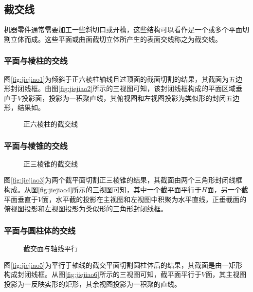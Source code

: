 
\subsection{截交线}
 机器零件通常需要加工一些斜切口或开槽，这些结构可以看作是一个或多个平面切割立体而成。这些平面或曲面截切立体所产生的表面交线称之为截交线。
 \subsubsection{平面与棱柱的交线}
图\ref{fig:jiejiao1}为倾斜于正六棱柱轴线且过顶面的截面切割的结果，其截面为五边形封闭线框。由图\ref{fig:jiejiao2}所示的三视图可知，该封闭线框构成的平面区域垂直于$V$投影面，投影为一积聚直线，其俯视图和左视图投影为类似形的封闭五边形，结果如。
 \begin{figure}[htbp]
 \centering
{}\hspace{30pt}
\caption{正六棱柱的截交线}
\end{figure}
\subsubsection{平面与棱锥的交线}
 \begin{figure}[htbp]
 \centering
{}\hspace{30pt}
\caption{正三棱锥的截交线}
\end{figure}
图\ref{fig:jiejiao3}为两个截平面切割正三棱锥的结果，其截面由两个三角形封闭线框构成。从图\ref{fig:jiejiao4}所示的三视图可知，其中一个截平面平行于$H$面，另一个截平面垂直于$V$面，水平截的投影在主视图和左视图中积聚为水平直线，正垂截面的俯视图投影和左视图投影为类似形的三角形封闭线框。

\subsubsection{平面与圆柱体的交线}
 \begin{figure}[htbp]
 \centering
{}\hspace{60pt}
\caption{截交面与轴线平行}
\end{figure}
图\ref{fig:jiejiao5}为平行于轴线的截交平面切割圆柱体后的结果，其截面是由一矩形构成封闭线框。从图\ref{fig:jiejiao6}所示的三视图可知，截平面平行于$V$面，其主视图投影为一反映实形的矩形，其余视图投影为一积聚的直线。

